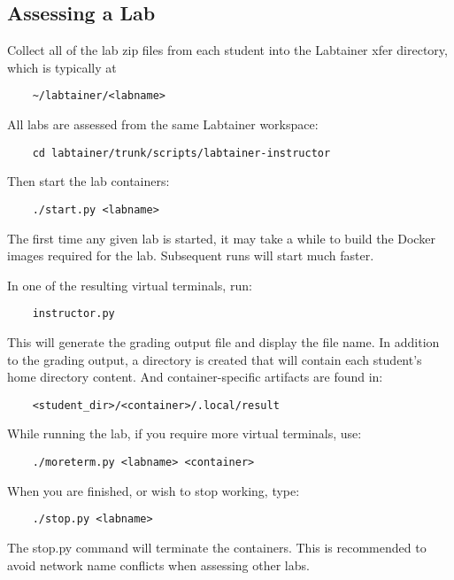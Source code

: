 \documentclass[12pt]{article}
\begin{document}
\subsection{Assessing a Lab}
Collect all of the lab zip files from each student into the Labtainer xfer directory, which
is typically at
\begin{verbatim}
    ~/labtainer/<labname>
\end{verbatim}
All labs are assessed from the same Labtainer workspace:
\begin{verbatim}
    cd labtainer/trunk/scripts/labtainer-instructor
\end{verbatim}
\noindent Then start the lab containers:
\begin{verbatim}
    ./start.py <labname>
\end{verbatim}

The first time any given lab is started, it may take a while to build the Docker images 
required for the lab.  Subsequent runs will start much faster.

In one of the resulting virtual terminals, run:
\begin{verbatim}
    instructor.py
\end{verbatim}
\noindent This will generate the grading output file and display the file name.  In
addition to the grading output, a directory is created that will contain each student's
home directory content.  And container-specific artifacts are found in:
\begin{verbatim}
    <student_dir>/<container>/.local/result
\end{verbatim}

While running the lab, if you require more virtual terminals, use:
\begin{verbatim}
    ./moreterm.py <labname> <container>
\end{verbatim}

When you are finished, or wish to stop working, type:
\begin{verbatim}
    ./stop.py <labname>
\end{verbatim}
The stop.py command will terminate the containers.  This is recommended to avoid network
name conflicts when assessing other labs.

\newpage
\appendix 
\end{document}
